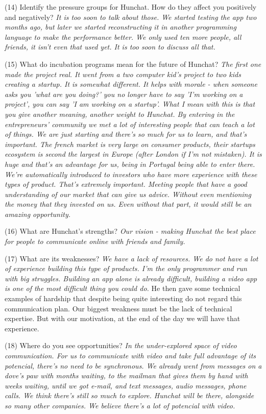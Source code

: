 \documentclass[12pt]{article}
\begin{document}
(14) Identify the pressure groups for Hunchat. How do they affect you positively and negatively? \textit{It is too soon to talk about those. We started testing the app two months ago, but later we started reconstructing it in another programming language to make the performance better. We only used ten more people, all friends, it isn't even that used yet. It is too soon to discuss all that. }

(15) What do incubation programs mean for the future of Hunchat? \textit{The first one made the project real. It went from a two computer kid's project to two kids creating a startup. It is somewhat different. It helps with morale - when someone asks you 'what are you doing?' you no longer have to say 'I'm working on a project', you can say 'I am working on a startup'. What I mean with this is that you give another meaning, another weight to Hunchat. By entering in the entrepreneurs' community we met a lot of interesting people that can teach a lot of things. We are just starting and there's so much for us to learn, and that's important. The french market is very large on consumer products, their startups ecosystem is second the largest in Europe (after London if I'm not mistaken). It is huge and that's an advantage for us, being in Portugal being able to enter there. We're automatically introduced to investors who have more experience with these types of product. That's extremely important. Meeting people that have a good understanding of our market that can give us advice. Without even mentioning the money that they invested on us. Even without that part, it would still be an amazing opportunity.}

(16) What are Hunchat’s strengths? \textit{Our vision - making Hunchat the best place for people to communicate online with friends and family.}

(17) What are its weaknesses? \textit{We have a lack of resources. We do not have a lot of experience building this type of products. I'm the only programmer and run with big struggles. Building an app alone is already difficult, building a video app is one of the most difficult thing you could do.} He then gave some technical examples of hardship that despite being quite interesting do not regard this communication plan. {Our biggest weakness must be the lack of technical expertise. But with our motivation, at the end of the day we will have that experience.}

(18) Where do you see opportunities? \textit{In the under-explored space of video communication. For us to communicate with video and take full advantage of its potencial, there's no need to be synchronous. We already went from messages on a dove's paw with months waiting, to the mailman that gives them by hand with weeks waiting, until we got e-mail, and text messages, audio messages, phone calls. We think there's still so much to explore. Hunchat will be there, alongside so many other companies. We believe there's a lot of potencial with video.}
\end{document}
